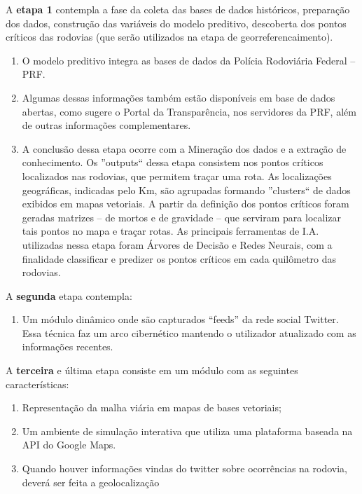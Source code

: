 A \textbf{etapa 1} contempla a fase da coleta das bases de dados históricos, preparação dos dados, construção das variáveis do modelo preditivo, descoberta dos pontos críticos das rodovias (que serão utilizados na etapa de georreferencaimento).
  \begin{enumerate}
    \item O modelo preditivo integra as bases de dados da Polícia Rodoviária Federal -- PRF.
 
    \item Algumas dessas informações também estão disponíveis em base de dados abertas, como sugere o Portal da Transparência, nos servidores da PRF, além de outras informações complementares.
    \item A conclusão dessa etapa ocorre com a Mineração dos dados e a extração de conhecimento.
	  Os ''outputs`` dessa etapa consistem nos pontos críticos localizados nas rodovias, que permitem traçar uma rota. 
	  As localizações geográficas, indicadas pelo Km, são agrupadas formando ''clusters`` de dados exibidos em mapas vetoriais. 
	  A partir da definição dos pontos críticos foram geradas matrizes -- de mortos e de gravidade -- que serviram para localizar tais pontos no mapa e traçar rotas.
	  As principais ferramentas de I.A. utilizadas nessa etapa foram Árvores de Decisão e Redes Neurais, com a finalidade classificar e predizer os pontos críticos em cada quilômetro das rodovias.\\
\end{enumerate}
  
A \textbf{segunda} etapa contempla:
 \begin{enumerate}
 	\item Um módulo dinâmico onde são capturados ``feeds'' da rede social Twitter. 
 	     Essa técnica faz um arco cibernético mantendo o utilizador atualizado com as informações recentes. 
  \end{enumerate}

A \textbf{terceira} e última etapa consiste em um módulo com as seguintes características:
  \begin{enumerate}
    \item Representação da malha viária em mapas de bases vetoriais;
    \item Um ambiente de simulação interativa que utiliza uma plataforma baseada na API do Google Maps.
    \item Quando houver informações vindas do twitter sobre ocorrências na rodovia, deverá ser feita a geolocalização
  \end{enumerate}



